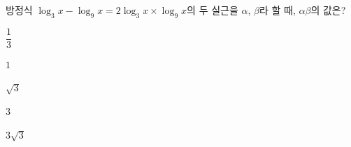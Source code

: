 방정식 $\log_3 x-\log_9 x=2\log_3 x\times\log_9 x$의 두 실근을 $\alpha$, $\beta$라 할 때, $\alpha\beta$의 값은?
\begin{choices32}{\rule[-3ex]{0pt}{8ex}$\dfrac{1}{3}$}{\rule[-3ex]{0pt}{8ex}$1$}{\rule[-3ex]{0pt}{8ex}$\sqrt{3}$}{\rule[-3ex]{0pt}{8ex}$3$}{\rule[-3ex]{0pt}{8ex}$3\sqrt{3}$}\end{choices32}
